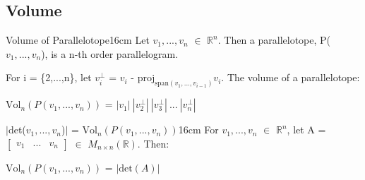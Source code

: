     \vspace{0.5cm}





\subsection{ Volume }

    \begin{definition}{Volume of Parallelotope}{16cm}
        Let $v_1,...,v_n$ $\in$ $\mathbb{R}^n$.
        Then a {\color{lblue} parallelotope}, P($v_1,...,v_n$),
        is a n-th order parallelogram.

        For i = \{2,...,n\}, let
        $v_i^{\perp}$ = $v_i$ - $\text{proj}_{\text{span}(v_1,...,v_{i-1})}v_i$.
        The volume of a parallelotope:

        \hspace{0.5cm}
        $\text{Vol}_n(P(v_1,...,v_n))$
        = $|v_1| \ |v_2^{\perp}| \ |v_3^{\perp}| \ ... \ |v_n^{\perp}|$
    \end{definition}

    \vspace{0.5cm}



    \begin{wtheorem}{$|$det($v_1,...,v_n$)$|$ = $\text{Vol}_n(P(v_1,...,v_n))$}{16cm}
        For $v_1,...,v_n$ $\in$ $\mathbb{R}^n$,
        let A =
        $\begin{bmatrix}
            v_1 & ... & v_n 
        \end{bmatrix}$
        $\in$ $M_{n \times n}(\mathbb{R})$. Then:

        \hspace{0.5cm}
        $\text{Vol}_n(P(v_1,...,v_n))$
        = $|\text{det}(A)|$
    \end{wtheorem}

